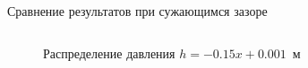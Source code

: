 \documentclass[ignoreonframetext,unicode]{beamer}
\begin{document}
\begin{frame}{Сравнение результатов при сужающимся зазоре}	
	\begin{columns}
		\begin{figure}[!htbp]
		\caption{Распределение давления $h = -0.15 x + 0.001$~м}
		\label{res_static}
	\end{figure}
	

\end{columns}
\end{frame}
\end{document}
